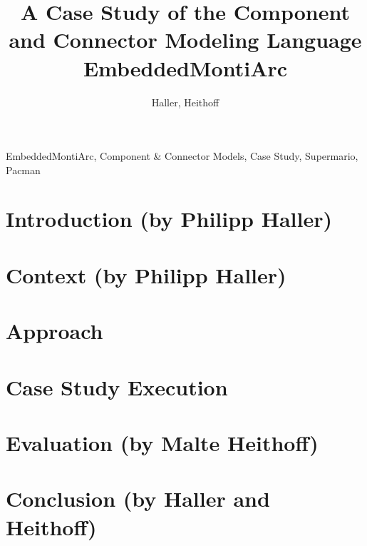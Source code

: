 \documentclass{elsarticle}
\begin{document}
\begin{frontmatter}

\title{A Case Study of the Component and Connector Modeling Language EmbeddedMontiArc}
\tnotetext[mytitlenote]{}

\author{Haller, Heithoff}
\address{Supervised by: Michael von Wenckstern and Bernhard Rumpe \\ Software Engineering, RWTH Aachen University}



\begin{abstract}

\end{abstract}

\begin{keyword}
EmbeddedMontiArc, Component \& Connector Models, Case Study, Supermario, Pacman
\end{keyword}

\end{frontmatter}

\linenumbers


\newpage
\section{Introduction (by Philipp Haller)}
\label{sec:intro}



\section{Context (by Philipp Haller)}
\label{sec:context}



\section{Approach}
\label{sec:approach}



\section{Case Study Execution}
\label{sec:implementation}



\section{Evaluation (by Malte Heithoff)}
\label{sec:evaluation}


\section{Conclusion (by Haller and Heithoff)}
\label{sec:conclusion}

\end{document}
